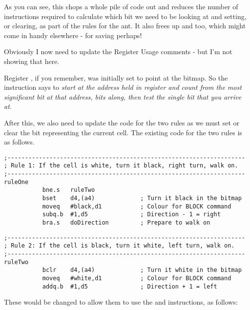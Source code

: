 As you can see, this chops a whole pile of code out and reduces the number of instructions required to calculate which bit we need to be looking at and setting, or clearing, as part of the rules for the ant. It also frees up  and  too, which might come in handy elsewhere - for saving  perhaps!

Obviously I now need to update the Register Usage comments - but I'm not showing that here.

Register , if you remember, was initially set to point at the  bitmap. So the  instruction says to \emph{start at the address held in register  and count from the most significant bit at that address,  bits along, then test the single bit that you arrive at.}

After  this, we also need to update the code for the two rules as we must set or clear the bit representing the current cell. The existing code for the two rules is as follows.



\begin{lstlisting}[firstnumber=293,caption={Langtons Ant - Existing Rule 1}]
;--------------------------------------------------------------------
; Rule 1: If the cell is white, turn it black, right turn, walk on.
;--------------------------------------------------------------------
ruleOne
           bne.s   ruleTwo
           bset    d4,(a4)             ; Turn it black in the bitmap
           moveq   #black,d1           ; Colour for BLOCK command
           subq.b  #1,d5               ; Direction - 1 = right
           bra.s   doDirection         ; Prepare to walk on

\end{lstlisting}



\begin{lstlisting}[firstnumber=303,caption={Langtons Ant - Existing Rule 2}]
;--------------------------------------------------------------------
; Rule 2: If the cell is black, turn it white, left turn, walk on.
;--------------------------------------------------------------------
ruleTwo
           bclr    d4,(a4)             ; Turn it white in the bitmap
           moveq   #white,d1           ; Colour for BLOCK command
           addq.b  #1,d5               ; Direction + 1 = left
\end{lstlisting}

These would be changed to allow them to use the  and  instructions, as follows:

